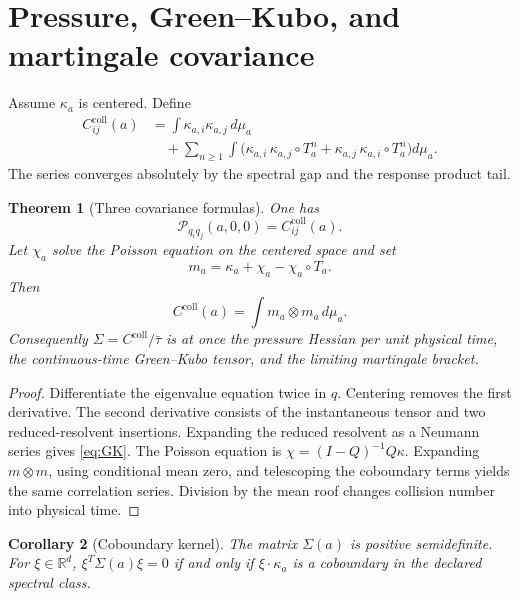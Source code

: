 \documentclass[11pt,reqno]{amsart}
\newtheorem{theorem}{Theorem}[section]
\newtheorem{corollary}[theorem]{Corollary}
\theoremstyle{definition}
\theoremstyle{remark}
\newcommand{\R}{\mathbb R}
\newcommand{\cP}{\mathscr P}
\begin{document}
\section{Pressure, Green--Kubo, and martingale covariance}\label{sec:covariance}

Assume $\kappa_a$ is centered.  Define
\begin{align}\label{eq:GK}
 C_{ij}^{\mathrm{coll}}(a)
 &=\int\kappa_{a,i}\kappa_{a,j}\,d\mu_a\\
 &\quad+\sum_{n\ge1}\int
 \bigl(\kappa_{a,i}\,\kappa_{a,j}\circ T_a^n
 +\kappa_{a,j}\,\kappa_{a,i}\circ T_a^n\bigr)d\mu_a.
\end{align}
The series converges absolutely by the spectral gap and the response product
tail.

\begin{theorem}[Three covariance formulas]\label{thm:covariance}
One has
\begin{equation}\label{eq:pressure-GK}
 \cP_{q_iq_j}(a,0,0)=C_{ij}^{\mathrm{coll}}(a).
\end{equation}
Let $\chi_a$ solve the Poisson equation on the centered space and set
\[
 m_a=\kappa_a+\chi_a-\chi_a\circ T_a.
\]
Then
\begin{equation}\label{eq:bracket}
 C^{\mathrm{coll}}(a)=\int m_a\otimes m_a\,d\mu_a.
\end{equation}
Consequently $\Sigma=C^{\mathrm{coll}}/\bar\tau$ is at once the pressure
Hessian per unit physical time, the continuous-time Green--Kubo tensor, and
the limiting martingale bracket.
\end{theorem}

\begin{proof}
Differentiate the eigenvalue equation twice in $q$.  Centering removes the
first derivative.  The second derivative consists of the instantaneous tensor
and two reduced-resolvent insertions.  Expanding the reduced resolvent as a
Neumann series gives \eqref{eq:GK}.  The Poisson equation is
$\chi=(I-Q)^{-1}Q\kappa$.  Expanding $m\otimes m$, using conditional mean zero,
and telescoping the coboundary terms yields the same correlation series.
Division by the mean roof changes collision number into physical time.
\end{proof}

\begin{corollary}[Coboundary kernel]\label{cor:coboundary}
The matrix $\Sigma(a)$ is positive semidefinite.  For $\xi\in\R^d$,
$\xi^T\Sigma(a)\xi=0$ if and only if $\xi\cdot\kappa_a$ is a coboundary in the
declared spectral class.
\end{corollary}
\end{document}
